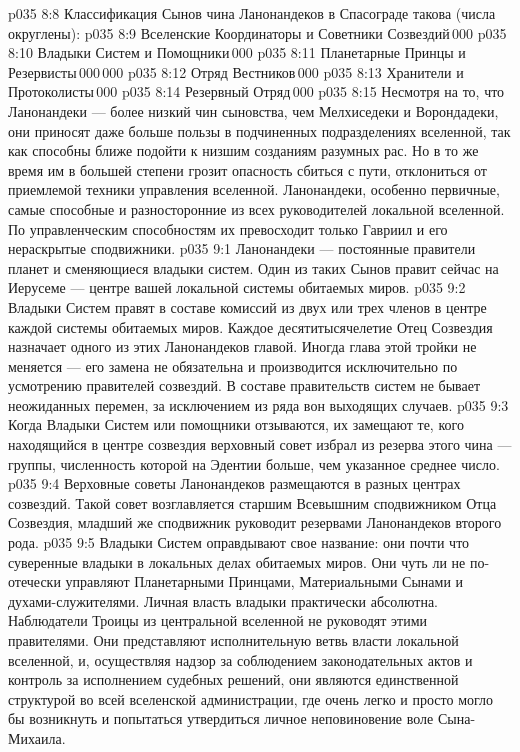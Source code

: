 \vs p035 8:8 Классификация Сынов чина Ланонандеков в Спасограде такова (числа округлены):
\vs p035 8:9 \pc Вселенские Координаторы и Советники Созвездий\,000
\vs p035 8:10 Владыки Систем и Помощники\,000
\vs p035 8:11 Планетарные Принцы и Резервисты\,000\,000
\vs p035 8:12 Отряд Вестников\,000
\vs p035 8:13 Хранители и Протоколисты\,000
\vs p035 8:14 Резервный Отряд\,000
\vs p035 8:15 \pc Несмотря на то, что Ланонандеки --- более низкий чин сыновства, чем Мелхиседеки и Ворондадеки, они приносят даже больше пользы в подчиненных подразделениях вселенной, так как способны ближе подойти к низшим созданиям разумных рас. Но в то же время им в большей степени грозит опасность сбиться с пути, отклониться от приемлемой техники управления вселенной. Ланонандеки, особенно первичные, самые способные и разносторонние из всех руководителей локальной вселенной. По управленческим способностям их превосходит только Гавриил и его нераскрытые сподвижники.
\vs p035 9:1 Ланонандеки --- постоянные правители планет и сменяющиеся владыки систем. Один из таких Сынов правит сейчас на Иерусеме --- центре вашей локальной системы обитаемых миров.
\vs p035 9:2 Владыки Систем правят в составе комиссий из двух или трех членов в центре каждой системы обитаемых миров. Каждое десятитысячелетие Отец Созвездия назначает одного из этих Ланонандеков главой. Иногда глава этой тройки не меняется --- его замена не обязательна и производится исключительно по усмотрению правителей созвездий. В составе правительств систем не бывает неожиданных перемен, за исключением из ряда вон выходящих случаев.
\vs p035 9:3 Когда Владыки Систем или помощники отзываются, их замещают те, кого находящийся в центре созвездия верховный совет избрал из резерва этого чина --- группы, численность которой на Эдентии больше, чем указанное среднее число.
\vs p035 9:4 Верховные советы Ланонандеков размещаются в разных центрах созвездий. Такой совет возглавляется старшим Всевышним сподвижником Отца Созвездия, младший же сподвижник руководит резервами Ланонандеков второго рода.
\vs p035 9:5 \pc Владыки Систем оправдывают свое название: они почти что суверенные владыки в локальных делах обитаемых миров. Они чуть ли не по\hyp{}отечески управляют Планетарными Принцами, Материальными Сынами и духами\hyp{}служителями. Личная власть владыки практически абсолютна. Наблюдатели Троицы из центральной вселенной не руководят этими правителями. Они представляют исполнительную ветвь власти локальной вселенной, и, осуществляя надзор за соблюдением законодательных актов и контроль за исполнением судебных решений, они являются единственной структурой во всей вселенской администрации, где очень легко и просто могло бы возникнуть и попытаться утвердиться личное неповиновение воле Сына\hyp{}Михаила.
